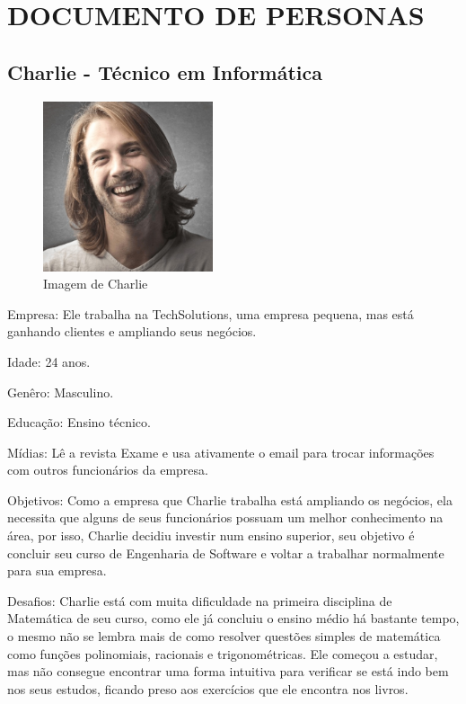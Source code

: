 \newpage
\chapter{DOCUMENTO DE PERSONAS}\label{apendice_personas}

\section{Charlie - Técnico em Informática}

\begin{figure}[H]
\centering
\includegraphics[width=5cm]{figuras/personas/figura_persona_1}
\caption{Imagem de Charlie}
\label{figura_persona_1}
\end{figure}


Empresa: Ele trabalha na TechSolutions, uma empresa pequena, mas está ganhando
clientes e ampliando seus negócios.

Idade: 24 anos.

Genêro: Masculino.

Educação: Ensino técnico.

Mídias: Lê a revista Exame e usa ativamente o email para trocar informações com 
outros funcionários da empresa.

Objetivos: Como a empresa que Charlie trabalha está ampliando os negócios, ela
necessita que alguns de seus funcionários possuam um melhor conhecimento na 
área, por isso, Charlie decidiu investir num ensino superior, seu objetivo é 
concluir seu curso de Engenharia de Software e voltar a trabalhar normalmente 
para sua empresa.

Desafios: Charlie está com muita dificuldade na primeira disciplina de 
Matemática de seu curso, como ele já concluiu o ensino médio há bastante tempo, 
o mesmo não se lembra mais de como resolver questões simples de matemática como 
funções polinomiais, racionais e trigonométricas. Ele começou a estudar, mas 
não consegue encontrar uma forma intuitiva para verificar se está indo bem nos 
seus estudos, ficando preso aos exercícios que ele encontra nos livros.

